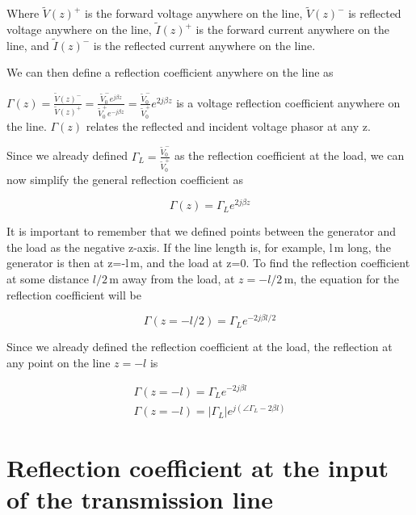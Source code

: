 \documentclass{ximera}
\begin{document}
Where $\tilde{V}(z)^+$ is the forward voltage anywhere on the line, $\tilde{V}(z)^-$ is reflected voltage anywhere on the line, $\tilde{I}(z)^+$ is the forward current anywhere on the line, and  $\tilde{I}(z)^-$ is the reflected current anywhere on the line.

We can then define a reflection coefficient anywhere on the line as

\begin{definition}
$\Gamma(z)=\frac{\tilde{V}(z)^-}{\tilde{V}(z)^+} = \frac{\tilde{V}_0^- e^{j \beta z}}{\tilde{V}_0^+ e^{-j \beta z}} = \frac{\tilde{V}_0^-}{\tilde{V}_0^+} e^{2j \beta z} $ is a voltage reflection coefficient anywhere on the line. $\Gamma(z)$ relates the reflected and incident voltage
phasor at any z. 

Since we already defined $\Gamma_L=\frac{\tilde{V}_0^-}{\tilde{V}_0^+}$ as the reflection coefficient at the load, we can now simplify the general reflection coefficient as 

\begin{equation}
\Gamma(z)=\Gamma_L e^{2j \beta z}
\end{equation}

It is important to remember that we defined points between the generator and the load as the negative z-axis. If the line length is, for example, l\,m long, the generator is then at z=-l\,m, and the load at z=0. To find the reflection coefficient at some distance $l/2$\,m away from the load,  at $z=-l/2$\,m, the equation for the reflection coefficient will be


\begin{equation}
\Gamma(z=-l/2)=\Gamma_L e^{-2j \beta l/2}
\end{equation}

\end{definition}

Since we already defined the reflection coefficient at the load, the reflection at any point on the line $z=-l$ is


\begin{eqnarray}
\Gamma(z=-l)=\Gamma_L e^{-2j \beta l} \\
\Gamma(z=-l)=|\Gamma_L| e^{j ( \angle \Gamma_L - 2 \beta l) }
\end{eqnarray}



\section{Reflection coefficient at the input of the transmission line}
\end{document}

